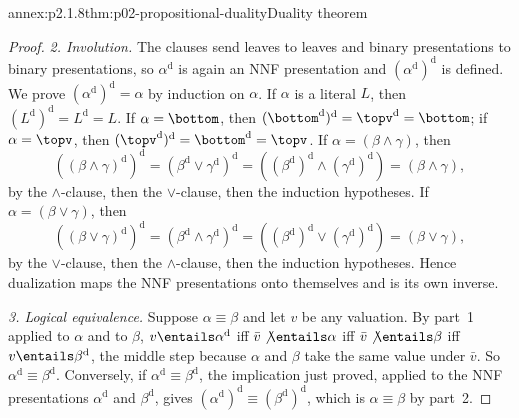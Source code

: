 \begin{annexitem}{annex:p2.1.8}{thm:p02-propositional-duality}{Duality theorem}
\begin{proof}
\emph{2. Involution.}  The clauses send leaves to leaves and binary
presentations to binary presentations, so \(\alpha^{\mathrm d}\) is again an
NNF presentation and \((\alpha^{\mathrm d})^{\mathrm d}\) is defined.  We prove
\((\alpha^{\mathrm d})^{\mathrm d}=\alpha\) by induction on \(\alpha\).
If \(\alpha\) is a literal \(L\), then
\((L^{\mathrm d})^{\mathrm d}=L^{\mathrm d}=L\).  If \(\alpha=\bottom\), then
\((\bottom^{\mathrm d})^{\mathrm d}=\topv^{\mathrm d}=\bottom\); if
\(\alpha=\topv\), then
\((\topv^{\mathrm d})^{\mathrm d}=\bottom^{\mathrm d}=\topv\).
If \(\alpha=(\beta\land\gamma)\), then
\[
 ((\beta\land\gamma)^{\mathrm d})^{\mathrm d}
 =(\beta^{\mathrm d}\lor\gamma^{\mathrm d})^{\mathrm d}
 =((\beta^{\mathrm d})^{\mathrm d}\land(\gamma^{\mathrm d})^{\mathrm d})
 =(\beta\land\gamma),
\]
by the \(\land\)-clause, then the \(\lor\)-clause, then the induction
hypotheses.  If \(\alpha=(\beta\lor\gamma)\), then
\[
 ((\beta\lor\gamma)^{\mathrm d})^{\mathrm d}
 =(\beta^{\mathrm d}\land\gamma^{\mathrm d})^{\mathrm d}
 =((\beta^{\mathrm d})^{\mathrm d}\lor(\gamma^{\mathrm d})^{\mathrm d})
 =(\beta\lor\gamma),
\]
by the \(\lor\)-clause, then the \(\land\)-clause, then the induction
hypotheses.  Hence dualization maps the NNF presentations onto themselves and
is its own inverse.

\emph{3. Logical equivalence.}  Suppose \(\alpha\equiv\beta\) and let \(v\) be
any valuation.  By part~1 applied to \(\alpha\) and to \(\beta\),
\(v\entails\alpha^{\mathrm d}\) iff \(\bar v\not\entails\alpha\) iff
\(\bar v\not\entails\beta\) iff \(v\entails\beta^{\mathrm d}\), the middle step
because \(\alpha\) and \(\beta\) take the same value under \(\bar v\).  So
\(\alpha^{\mathrm d}\equiv\beta^{\mathrm d}\).  Conversely, if
\(\alpha^{\mathrm d}\equiv\beta^{\mathrm d}\), the implication just proved,
applied to the NNF presentations \(\alpha^{\mathrm d}\) and
\(\beta^{\mathrm d}\), gives
\((\alpha^{\mathrm d})^{\mathrm d}\equiv(\beta^{\mathrm d})^{\mathrm d}\), which
is \(\alpha\equiv\beta\) by part~2.


\end{proof}
\end{annexitem}
